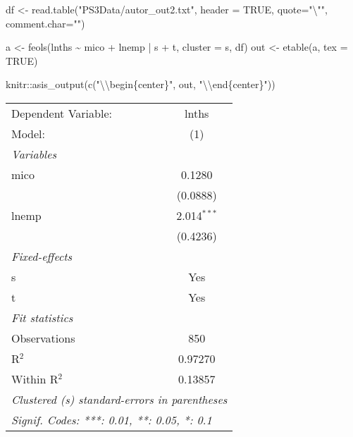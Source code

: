 \documentclass[
]{article}
\newenvironment{Shaded}{\begin{snugshade}}{\end{snugshade}}
\newcommand{\AttributeTok}[1]{\textcolor[rgb]{0.77,0.63,0.00}{#1}}
\newcommand{\ConstantTok}[1]{\textcolor[rgb]{0.00,0.00,0.00}{#1}}
\newcommand{\FunctionTok}[1]{\textcolor[rgb]{0.00,0.00,0.00}{#1}}
\newcommand{\NormalTok}[1]{#1}
\newcommand{\OtherTok}[1]{\textcolor[rgb]{0.56,0.35,0.01}{#1}}
\newcommand{\SpecialCharTok}[1]{\textcolor[rgb]{0.00,0.00,0.00}{#1}}
\newcommand{\StringTok}[1]{\textcolor[rgb]{0.31,0.60,0.02}{#1}}
\begin{document}
\begin{Shaded}
\begin{Highlighting}[]
\NormalTok{df }\OtherTok{\textless{}{-}} \FunctionTok{read.table}\NormalTok{(}\StringTok{"PS3Data/autor\_out2.txt"}\NormalTok{, }\AttributeTok{header =} \ConstantTok{TRUE}\NormalTok{, }
                 \AttributeTok{quote=}\StringTok{"}\SpecialCharTok{\textbackslash{}"}\StringTok{"}\NormalTok{, }\AttributeTok{comment.char=}\StringTok{""}\NormalTok{)}

\NormalTok{a }\OtherTok{\textless{}{-}} \FunctionTok{feols}\NormalTok{(lnths }\SpecialCharTok{\textasciitilde{}}\NormalTok{ mico }\SpecialCharTok{+}\NormalTok{ lnemp }\SpecialCharTok{|}\NormalTok{ s }\SpecialCharTok{+}\NormalTok{ t, }\AttributeTok{cluster =} \StringTok{\textquotesingle{}s\textquotesingle{}}\NormalTok{, df)}
\NormalTok{out }\OtherTok{\textless{}{-}} \FunctionTok{etable}\NormalTok{(a, }\AttributeTok{tex =} \ConstantTok{TRUE}\NormalTok{) }
\end{Highlighting}
\end{Shaded}

\begin{Shaded}
\begin{Highlighting}[]
\NormalTok{knitr}\SpecialCharTok{::}\FunctionTok{asis\_output}\NormalTok{(}\FunctionTok{c}\NormalTok{(}\StringTok{"}\SpecialCharTok{\textbackslash{}\textbackslash{}}\StringTok{begin\{center\}"}\NormalTok{, out, }\StringTok{"}\SpecialCharTok{\textbackslash{}\textbackslash{}}\StringTok{end\{center\}"}\NormalTok{)) }
\end{Highlighting}
\end{Shaded}

\begin{center}\begingroup\centering\begin{tabular}{lc}   \tabularnewline \midrule \midrule   Dependent Variable: & lnths\\     Model:              & (1)\\     \midrule   \emph{Variables}\\   mico                & 0.1280\\                          & (0.0888)\\      lnemp               & 2.014$^{***}$\\                          & (0.4236)\\      \midrule   \emph{Fixed-effects}\\   s                   & Yes\\     t                   & Yes\\     \midrule   \emph{Fit statistics}\\   Observations        & 850\\     R$^2$               & 0.97270\\     Within R$^2$        & 0.13857\\     \midrule \midrule   \multicolumn{2}{l}{\emph{Clustered (s) standard-errors in parentheses}}\\   \multicolumn{2}{l}{\emph{Signif. Codes: ***: 0.01, **: 0.05, *: 0.1}}\\\end{tabular}\par\endgroup\end{center}
\end{document}
